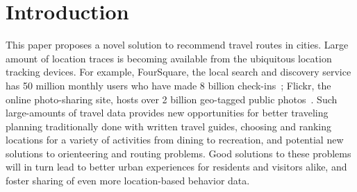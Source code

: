 
\section{Introduction}
\label{sec:introduction}

This paper proposes a novel solution to recommend travel routes in cities. 
Large amount of location traces is becoming available from the ubiquitous location tracking devices. 
For example, FourSquare, the local search and discovery service has 50 million monthly users who have made 8 billion check-ins~\cite{4sq}; Flickr, the online photo-sharing site, hosts over 2 billion geo-tagged public photos~\cite{flickr}. Such large-amounts of travel data provides new opportunities for better 
traveling planning traditionally done with written travel guides, 
choosing and ranking locations for a variety of activities from dining to recreation, 
and potential new solutions to orienteering and routing problems. 
Good solutions to these problems will in turn lead to better urban experiences for residents and visitors alike, and foster sharing of even more location-based behavior data. 

